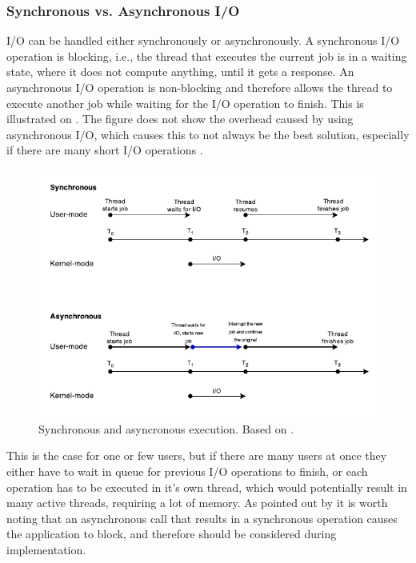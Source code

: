 

\subsubsection{Synchronous vs. Asynchronous I/O}
I/O can be handled either synchronously or asynchronously. A synchronous I/O operation is blocking, i.e., the thread that executes the current job is in a waiting state, where it does not compute anything, until it gets a response. An asynchronous I/O operation is non-blocking and therefore allows the thread to execute another job while waiting for the I/O operation to finish. This is illustrated on . The figure does not show the overhead caused by using asynchronous I/O, which causes this to not always be the best solution, especially if there are many short I/O operations \cite{ms-syn-asyn}.

\begin{figure}[H]
  \centering
  \includegraphics[scale=1.2]{billeder/sync-async.pdf}  
  \caption{Synchronous and asyncronous execution. Based on \cite{ms-syn-asyn}.}
  \label{fig:syncasync}
\end{figure}

This is the case for one or few users, but if there are many users at once they either have to wait in queue for previous I/O operations to finish, or each operation has to be executed in it's own thread, which would potentially result in many active threads, requiring a lot of memory. As pointed out by \citet{amir} it is worth noting that an asynchronous call that results in a synchronous operation causes the application to block, and therefore should be considered during implementation.

